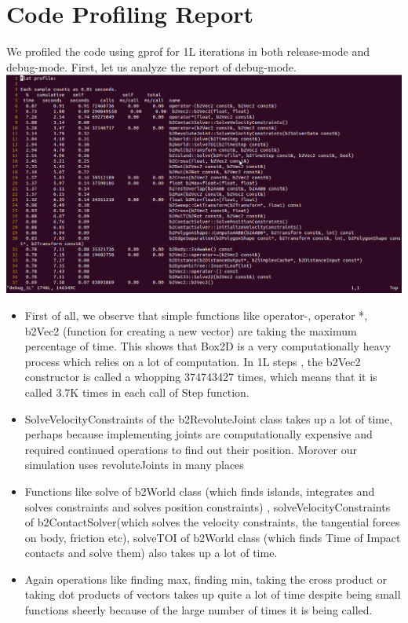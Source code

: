 \documentclass[english]{article}
\begin{document}
\section{Code Profiling Report}
We profiled the code using gprof for 1L iterations in both release-mode and debug-mode.
\newline
First, let us analyze the report of debug-mode. 
\newline
\includegraphics[width=18cm]{doc/debug_1L.png}
\begin{itemize}
\item First of all, we observe that simple functions like operator-, operator *, b2Vec2 (function for creating a new vector) are taking the maximum percentage of time. This shows that Box2D is a very computationally heavy process which relies on a lot of computation. In 1L steps , the b2Vec2 constructor is called a whopping 374743427 times, which means that it is called 3.7K times in each call of Step function.
\item SolveVelocityConstraints of the b2RevoluteJoint class takes up a lot of time, perhaps because implementing joints are computationally expensive and required continued operations to find out their position. Morover our simulation uses revoluteJoints in many places
\item Functions like solve of b2World class (which finds islands, integrates and solves constraints and  solves position constraints) , solveVelocityConstraints of b2ContactSolver(which solves the velocity constraints, the tangential forces on body, friction etc),  solveTOI of b2World class (which finds Time of Impact contacts and solve them) also takes up a lot of time. 	
\item Again operations like finding max, finding min, taking the cross product or taking dot products of vectors takes up quite a lot of time despite being small functions sheerly because of the large number of times it is being called. 
\end{itemize}
\end{document}
